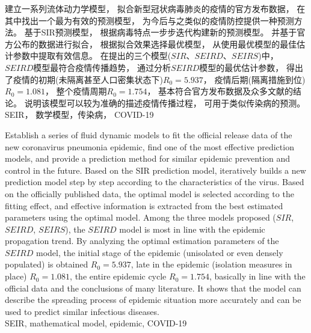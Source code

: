 \begin{cnabstract}
	\songti {}
	建立一系列流体动力学模型，
	拟合新型冠状病毒肺炎的疫情的官方发布数据，
	在其中找出一个最为有效的预测模型，
	为今后与之类似的疫情防控提供一种预测方法。
	基于SIR预测模型，
	根据病毒特点一步步迭代构建新的预测模型。
	并基于官方公布的数据进行拟合，
	根据拟合效果选择最优模型，
	从使用最优模型的最佳估计参数中提取有效信息。
	在提出的三个模型($SIR$、$SEIRD$、$SEIRS$)中，
	$SEIRD$模型最符合疫情传播趋势，
	通过分析$SEIRD$模型的最优估计参数，
	得出了疫情的初期(未隔离甚至人口密集状态下)$R_0=5.937$，
	疫情后期(隔离措施到位)$R_0=1.081$，
	整个疫情周期$R_0=1.754$，
	基本符合官方发布数据及众多文献的结论。
	说明该模型可以较为准确的描述疫情传播过程，
	可用于类似传染病的预测。
	\\
	 SEIR， 数学模型，传染病， COVID-19
\end{cnabstract}
\begin{enabstract}
	Establish a series of fluid dynamic models to fit the official release data of the new coronavirus pneumonia epidemic,
	find one of the most effective prediction models,
	and provide a prediction method for similar epidemic prevention and control in the future.
	Based on the SIR prediction model,
	iteratively builds a new prediction model step by step according to the characteristics of the virus.
	Based on the officially published data,
	the optimal model is selected according to the fitting effect,
	and effective information is extracted from the best estimated parameters using the optimal model.
	Among the three models proposed ($SIR$, $SEIRD$, $SEIRS$),
	the $SEIRD$ model is most in line with the epidemic propagation trend.
	By analyzing the optimal estimation parameters of the $SEIRD$ model,
	the initial stage of the epidemic (unisolated or even densely populated) is obtained $R_0 = 5.937$,
	late in the epidemic (isolation measures in place) $R_0 = 1.081$,
	the entire epidemic cycle $R_0 = 1.754$,
	basically in line with the official data and the conclusions of many literature.
	It shows that the model can describe the spreading process of epidemic situation more accurately and can be used to predict similar infectious diseases.
	\\
	 SEIR, mathematical model, epidemic, COVID-19
\end{enabstract}